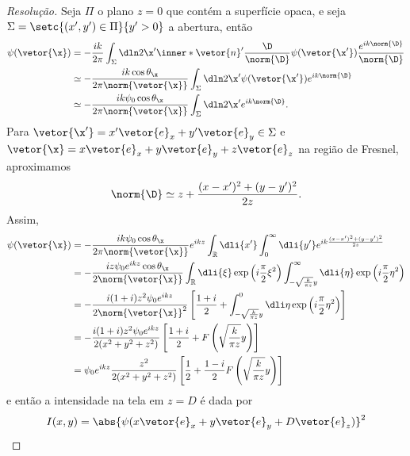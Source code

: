 \begin{proof}[Resolução]
    Seja \(\Pi\) o plano \(z = 0\) que contém a superfície opaca, e seja \(\Sigma = \setc{(x', y') \in \Pi}{y' > 0}\) a abertura, então
    \begin{align*}
        \psi(\vetor{\x}) &= - \frac{i k}{2\pi} \int_{\Sigma} \dln2{\x'} \inner*{\vetor{n}'}{\frac{\D}{\norm{\D}}} \psi(\vetor{\x'}) \frac{e^{ik \norm{\D}}}{\norm{\D}}\\
                         &\simeq -\frac{ik \cos\theta_{\x}}{2\pi \norm{\vetor{\x}}} \int_{\Sigma} \dln2{\x'} \psi(\vetor{\x'}) e^{ik \norm{\D}}\\
                         &\simeq -\frac{ik \psi_0 \cos\theta_{\x}}{2\pi \norm{\vetor{\x}}} \int_{\Sigma} \dln2{\x'} e^{ik \norm{\D}}.
    \end{align*}
    Para \(\vetor{\x'} = x' \vetor{e}_x + y' \vetor{e}_y \in \Sigma\) e \(\vetor{\x} = x \vetor{e}_x + y \vetor{e}_y + z \vetor{e}_z\) na região de Fresnel, aproximamos
    \begin{equation*}
        \norm{\D} \simeq z + \frac{(x - x')^2 + (y - y')^2}{2z}.
    \end{equation*}
    Assim,
    \begin{align*}
        \psi(\vetor{\x}) &= -\frac{ik \psi_0 \cos\theta_{\x}}{2\pi \norm{\vetor{\x}}} e^{ikz} \int_{\mathbb{R}} \dli{x'} \int_{0}^\infty \dli{y'}e^{ik \frac{(x - x')^2 + (y - y')^2}{2z}}\\
                         &= -\frac{iz \psi_0 e^{ikz} \cos\theta_{\x}}{2\norm{\vetor{\x}}}  \int_{\mathbb{R}} \dli{\xi} \exp\left(i\frac{\pi}{2}\xi^2\right) \int_{-\sqrt{\frac{k}{\pi z}}y}^{\infty} \dli{\eta}\exp\left(i \frac{\pi}{2} \eta^2\right)\\
                         &= -\frac{i (1 + i)z^2 \psi_0 e^{ikz}}{2 \norm{\vetor{\x}}^2}  \left[\frac{1 + i}{2} + \int_{-\sqrt{\frac{k}{\pi z}}y}^0 \dli\eta \exp\left(i\frac{\pi}{2} \eta^2\right)\right]\\
                         &= -\frac{i(1 + i)z^2 \psi_0 e^{ikz}}{2(x^2 + y^2 + z^2)}  \left[\frac{1 + i}{2} + F\left(\sqrt{\frac{k}{\pi{z}}}y\right)\right]\\
                         &= \psi_0 e^{ikz} \frac{z^2}{2 (x^2 + y^2 + z^2)}\left[\frac12 + \frac{1 - i}{2} F\left(\sqrt{\frac{k}{\pi z}} y\right)\right]
    \end{align*}
    e então a intensidade na tela em \(z = D\) é dada por
    \begin{align*}
        I(x,y) &= \abs{\psi(x\vetor{e}_x + y\vetor{e}_y + D \vetor{e}_z)}^2\\

\end{align*}
\end{proof}
